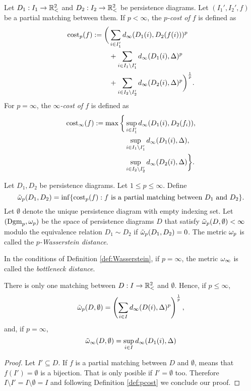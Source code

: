 \begin{definition}[$p$-cost] \label{def:pcost}
    Let $ D_1: I_1 \to \mathbb{R}_<^2 $ and $ D_2: I_2 \to \mathbb{R}_<^2 $ be persistence diagrams. Let $ (I_1', I_2', f) $ be a partial matching between them. If $ p < \infty $, the {\it $p$-cost of $ f $} is defined as
    \begin{align*}
        \operatorname{cost}_p(f) := \bigg(&\sum_{i \in I_1'} d_\infty(D_1(i), D_2(f(i)))^p \\
        &+ \sum_{i \in I_1 \setminus I_1'} d_\infty(D_1(i), \Delta)^p \\
        &+ \sum_{i \in I_2 \setminus I_2'} d_\infty(D_2(i), \Delta)^p \bigg)^{\frac{1}{p}}.
    \end{align*}
    For $ p = \infty $, the {\it $\infty$-cost of $ f $} is defined as
    \begin{align*}
        \operatorname{cost}_\infty(f) := \max \bigg\{&\sup_{i \in I_1'} d_\infty(D_1(i), D_2(f_i)), \\
        &\sup_{i\in I_1 \setminus I_1'} d_\infty(D_1(i), \Delta), \\
        &\sup_{i\in I_2 \setminus I_2'} d_\infty(D_2(i), \Delta)\bigg\}.
    \end{align*}
\end{definition}

\begin{definition} \label{def:Wasserstein}
    Let $ D_1, D_2 $ be persistence diagrams. Let $ 1 \leq p \leq \infty $. Define
    $$
        \tilde \omega_p (D_1, D_2) = \inf \{\operatorname{cost}_p(f) : f \text{ is a partial matching between } D_1 \text{ and } D_2 \}.
    $$
    Let $ \emptyset $ denote the unique persistence diagram with empty indexing set. Let $ (\operatorname{Dgm}_p, \omega_p) $ be the space of persistence diagrams $ D $ that satisfy $ \tilde \omega_p(D, \emptyset) < \infty $ modulo the equivalence relation $ D_1 \sim D_2 $ if $ \tilde \omega_p (D_1, D_2) = 0 $. The metric $ \omega_p $ is called the {\it $p$-Wasserstein distance}.
\end{definition}

\begin{definition}
    In the conditions of Definition \ref{def:Wasserstein}, if $ p = \infty $, the metric $ \omega_\infty $ is called the {\it bottleneck distance}.
\end{definition}

\begin{proposition} \label{prop-empty-mathing-distance}
    There is only one matching between $ D: I \to \mathbb{R}_<^2 $ and $ \emptyset $. Hence, if $ p \leq \infty $,
    $$
        \tilde \omega_p(D, \emptyset) = \left(\sum_{i\in I} d_\infty(D(i), \Delta)^p\right)^{\frac{1}{p}},
    $$
    and, if $ p = \infty $,
    $$
        \tilde \omega_\infty(D, \emptyset) = \sup_{i\in I} d_\infty(D_1(i), \Delta)
    $$
\end{proposition}
\begin{proof}
    Let $ I' \subseteq D $. If $ f $ is a partial matching between $ D $ and $ \emptyset $, means that $ f(I') = \emptyset$ is a bijection. That is only posible if $ I' = \emptyset $ too. Therefore $ I \setminus I' = I \setminus \emptyset = I $ and following Definition \ref{def:pcost} we conclude our proof.
\end{proof}

